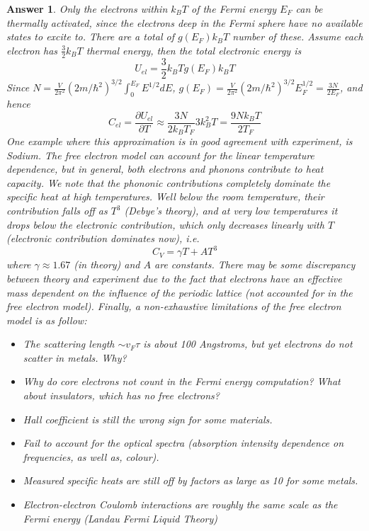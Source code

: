 \documentclass[a4paper]{article}
\newtheorem{ans}{Answer}[subsection]
\theoremstyle{new}
\begin{document}
\begin{ans}
Only the electrons within $k_BT$ of the Fermi energy $E_F$ can be thermally activated, since the electrons deep in the Fermi sphere have no available states to excite to. There are a total of $g(E_F)k_BT$ number of these. Assume each electron has $\frac{3}{2}k_BT$ thermal energy, then the total electronic energy is
$$U_{el}=\frac{3}{2}k_BTg(E_F)k_BT$$
Since $N=\frac{V}{2\pi^2}(2m/\hbar^2)^{3/2}\int_0^{E_F}E^{1/2}dE$, $g(E_F)=\frac{V}{2\pi^2}(2m/\hbar^2)^{3/2}E_F^{1/2}=\frac{3N}{2E_F}$, and hence 
$$C_{el}=\frac{\partial U_{el}}{\partial T}\approx\frac{3N}{2k_BT_F}3k_B^2T=\frac{9Nk_BT}{2T_F}$$
One example where this approximation is in good agreement with experiment, is Sodium. The free electron model can account for the linear temperature dependence, but in general, both electrons and phonons contribute to heat capacity. We note that the phononic contributions completely dominate the specific heat at high temperatures. Well below the room temperature, their contribution falls off as $T^3$ (Debye's theory), and at very low temperatures it drops below the electronic contribution, which only decreases linearly with $T$ (electronic contribution dominates now), i.e. 
$$C_V=\gamma T+AT^3$$
where $\gamma\approx 1.67$ (in theory) and $A$ are constants. There may be some discrepancy between theory and experiment due to the fact that electrons have an effective mass dependent on the influence of the periodic lattice (not accounted for in the free electron model). Finally, a non-exhaustive limitations of the free electron model is as follow:
\begin{itemize}
    \item The scattering length $\sim v_F\tau$ is about 100 Angstroms, but yet electrons do not scatter in metals. Why?
    \item Why do core electrons not count in the Fermi energy computation? What about insulators, which has no free electrons?
    \item Hall coefficient is still the wrong sign for some materials.
    \item Fail to account for the optical spectra (absorption intensity dependence on frequencies, as well as, colour).
    \item Measured specific heats are still off by factors as large as 10 for some metals.
    \item Electron-electron Coulomb interactions are roughly the same scale as the Fermi energy (Landau Fermi Liquid Theory)
\end{itemize}


\end{ans}
\end{document}
